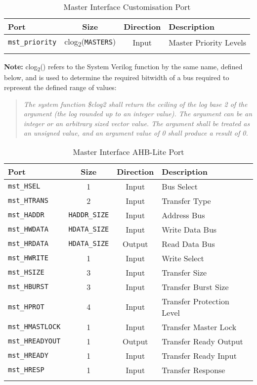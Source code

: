 \begin{longtable}[]{@{}lccl@{}}
\toprule
Port & Size & Direction & Description\tabularnewline
\midrule
\endhead
\texttt{mst\_priority}  & clog\textsubscript{2}(\texttt{MASTERS}) & Input & Master Priority Levels\tabularnewline
\bottomrule
\caption{Master Interface Customisation Port}
\end{longtable}

\textbf{Note:} clog\textsubscript{2}() refers to the System Verilog function by
the same name, defined below, and is used to determine the required bitwidth of a
bus required to represent the defined range of values:

\begin{quote}
\emph{The system function \$clog2 shall return the ceiling of the log
base 2 of the argument (the log rounded up to an integer value). The
argument can be an integer or an arbitrary sized vector value. The
argument shall be treated as an unsigned value, and an argument value of
0 shall produce a result of 0.}
\end{quote}

\begin{longtable}[]{@{}lccl@{}}
\toprule
Port & Size & Direction & Description\tabularnewline
\midrule
\endhead
\texttt{mst\_HSEL}      & 1                     & Input  & Bus Select\tabularnewline
\texttt{mst\_HTRANS}    & 2                     & Input  & Transfer Type\tabularnewline
\texttt{mst\_HADDR}     & \texttt{HADDR\_SIZE}  & Input  & Address Bus\tabularnewline
\texttt{mst\_HWDATA}    & \texttt{HDATA\_SIZE}  & Input  & Write Data Bus\tabularnewline
\texttt{mst\_HRDATA}    & \texttt{HDATA\_SIZE}  & Output & Read Data Bus\tabularnewline
\texttt{mst\_HWRITE}    & 1                     & Input  & Write Select\tabularnewline
\texttt{mst\_HSIZE}     & 3                     & Input  & Transfer Size\tabularnewline
\texttt{mst\_HBURST}    & 3                     & Input  & Transfer Burst Size\tabularnewline
\texttt{mst\_HPROT}     & 4                     & Input  & Transfer Protection Level\tabularnewline
\texttt{mst\_HMASTLOCK} & 1                     & Input  & Transfer Master Lock\tabularnewline
\texttt{mst\_HREADYOUT} & 1                     & Output & Transfer Ready Output\tabularnewline
\texttt{mst\_HREADY}    & 1                     & Input  & Transfer Ready Input\tabularnewline
\texttt{mst\_HRESP}     & 1                     & Input  & Transfer Response\tabularnewline
\bottomrule
\caption{Master Interface AHB-Lite Port}
\end{longtable}


